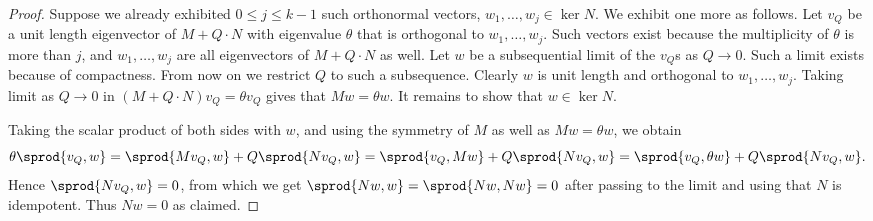 \begin{proof}
Suppose we already exhibited $0 \leq j \leq k-1$ such orthonormal vectors, $w_1, \dots, w_j \in \ker N$. We exhibit one more as follows. Let $v_Q$ be a unit length eigenvector of $M+Q \cdot N$ with eigenvalue $\theta$ that is orthogonal to $w_1, \dots, w_j$. Such vectors exist because the multiplicity of $\theta$ is more than $j$, and $w_1, \dots, w_j$ are all eigenvectors of $M+ Q \cdot N$ as well. Let $w$ be a subsequential limit of the $v_Q$s as $Q \to 0$. Such a limit exists because of compactness. From now on we restrict $Q$ to such a subsequence. Clearly $w$ is unit length and orthogonal to $w_1, \dots, w_j$. Taking limit as $Q \to 0$ in $(M+Q \cdot N)v_Q = \theta v_Q$ gives that $M w= \theta w$.  It remains to show that $w \in \ker N$.

Taking the scalar product of both sides with $w$, and using the symmetry of $M$ as well as $M w = \theta w$, we obtain
\[ \theta \sprod{v_Q, w}=  \sprod{M v_Q, w} + Q \sprod{N v_Q, w} = \sprod{v_Q, M w} + Q \sprod{N v_Q, w} = \sprod{v_Q, \theta w} + Q \sprod{N v_Q, w} . \]
Hence $\sprod{N v_Q, w} =0$, from which we get $\sprod{N w,w}=\sprod{Nw, Nw} = 0$ after passing to the limit and using that $N$ is idempotent. Thus $N w =0$ as claimed.
\end{proof}
